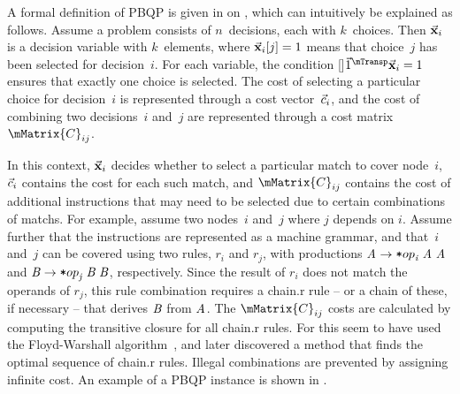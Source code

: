 A formal definition of \gls{PBQP} is given in
 on ,
which can intuitively be explained as follows.
%
Assume a problem consists of $n$~decisions, each with $k$~choices.
%
Then $\mVector{\mVar{x}}_i$ is a \gls{decision variable} with $k$~elements,
where \mbox{$\mVector{\mVar{x}}_i[j] = 1$} means that choice~$j$ has been
selected for decision~$i$.
%
For each \gls{variable}, the condition
\raisebox{0pt}[\height-2pt]{$\mVector{1}^{\mTransp} \mVector{\mVar{x}}_i = 1$}
ensures that exactly one choice is selected.
%
The cost of selecting a particular choice for decision~$i$ is represented
through a cost vector~$\vec{c}_i$, and the cost of combining two
decisions~$i$ and~$j$ are represented through a cost matrix~$\mMatrix{C}_{ij}$.

In this context, $\mVector{\mVar{x}}_i$ decides whether to select a particular
\gls{match} to cover \gls{node}~$i$, $\vec{c}_i$ contains the cost for each
such \gls{match}, and $\mMatrix{C}_{ij}$ contains the cost of additional
\glspl{instruction} that may need to be selected due to certain combinations of
\glspl{match}.
%
For example, assume two nodes~$i$ and~$j$ where $j$ depends on $i$.
%
Assume further that the \glspl{instruction} are represented as a
 \gls{machine grammar}, and that~$i$ and~$j$ can be
covered using two \glspl{rule}, $r_i$ and $r_j$, with \glspl{production}
\mbox{$\mNT{A} \rightarrow \irCode*{op}_{\mathit{i}} \; \mNT{A} \; \mNT{A}$} and
\mbox{$\mNT{B} \rightarrow \irCode*{op}_{\mathit{j}} \; \mNT{B} \; \mNT{B}$},
respectively.
%
Since the result of $r_i$ does not match the operands of $r_j$, this \gls{rule}
combination requires a \gls{chain.r} \gls{rule} -- or a chain of these, if
necessary -- that derives $\mNT{B}$ from $\mNT{A}$.
%
The $\mMatrix{C}_{ij}$ costs are calculated by computing the \gls{transitive
  closure} for all \gls{chain.r} \glspl{rule}.
%
For this \citeauthor{EcksteinEtAl:2003} seem to have used the Floyd-Warshall
algorithm~\cite{Floyd:1962}, and \textcite{SchaeferScholz:2007} later discovered
a method that finds the optimal sequence of \gls{chain.r} \glspl{rule}.
%
Illegal combinations are prevented by assigning infinite cost.
%
An example of a \gls{PBQP} instance is shown in .

